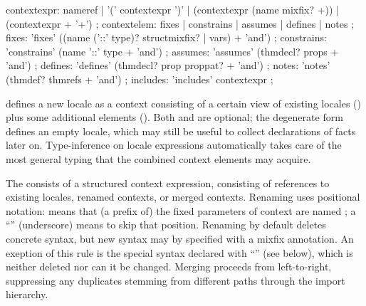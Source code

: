 \begin{isabellebody}
\begin{isamarkuptext}
\begin{rail}
    contextexpr: nameref | '(' contextexpr ')' |
    (contextexpr (name mixfix? +)) | (contextexpr + '+')
    ;
    contextelem: fixes | constrains | assumes | defines | notes
    ;
    fixes: 'fixes' ((name ('::' type)? structmixfix? | vars) + 'and')
    ;
    constrains: 'constrains' (name '::' type + 'and')
    ;
    assumes: 'assumes' (thmdecl? props + 'and')
    ;
    defines: 'defines' (thmdecl? prop proppat? + 'and')
    ;
    notes: 'notes' (thmdef? thmrefs + 'and')
    ;
    includes: 'includes' contextexpr
    ;
  \end{rail}

  \begin{descr}
  
  \item [\hyperlink{command.locale}{\mbox{\isa{\isacommand{locale}}}}~\isa{{\isachardoublequote}loc\ {\isacharequal}\ import\ {\isacharplus}\ body{\isachardoublequote}}] defines a
  new locale  as a context consisting of a certain view of
  existing locales () plus some additional elements
  ().  Both  and  are optional;
  the degenerate form \hyperlink{command.locale}{\mbox{}}~ defines an empty
  locale, which may still be useful to collect declarations of facts
  later on.  Type-inference on locale expressions automatically takes
  care of the most general typing that the combined context elements
  may acquire.

  The  consists of a structured context expression,
  consisting of references to existing locales, renamed contexts, or
  merged contexts.  Renaming uses positional notation:  means that (a prefix of) the fixed
  parameters of context  are named ; a ``\isa{{\isacharunderscore}}'' (underscore) means to skip that
  position.  Renaming by default deletes concrete syntax, but new
  syntax may by specified with a mixfix annotation.  An exeption of
  this rule is the special syntax declared with ``\isa{{\isachardoublequote}{\isacharparenleft}{\isasymSTRUCTURE}{\isacharparenright}{\isachardoublequote}}'' (see below), which is neither deleted nor can it
  be changed.  Merging proceeds from left-to-right, suppressing any
  duplicates stemming from different paths through the import
  hierarchy.


\end{descr}
\end{isamarkuptext}
\end{isabellebody}
